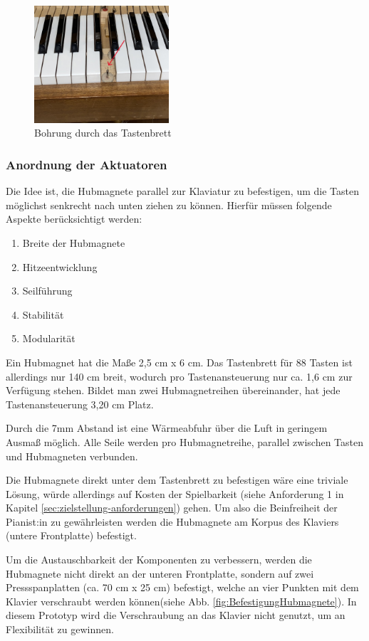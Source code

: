 \begin{figure}[htbp]
    \centering
    \includegraphics[width=5cm]{img/Klaviatur.jpg}
    \caption{Bohrung durch das Tastenbrett}
    \label{fig:klaviatur}
\end{figure}

\subsubsection{Anordnung der Aktuatoren}

Die Idee ist, die Hubmagnete parallel zur Klaviatur zu befestigen, um die Tasten möglichst senkrecht nach unten ziehen zu können.
Hierfür müssen folgende Aspekte berücksichtigt werden:

\begin{enumerate}
    \item Breite der Hubmagnete
    \item Hitzeentwicklung
    \item Seilführung
    \item Stabilität
    \item Modularität
\end{enumerate}

Ein Hubmagnet hat die Maße 2,5 cm x 6 cm.
Das Tastenbrett für 88 Tasten ist allerdings nur 140 cm breit, wodurch pro Tastenansteuerung nur ca. 1,6 cm zur Verfügung stehen.
Bildet man zwei Hubmagnetreihen übereinander, hat jede Tastenansteuerung 3,20 cm Platz.

Durch die 7mm Abstand ist eine Wärmeabfuhr über die Luft in geringem Ausmaß möglich.
Alle Seile werden pro Hubmagnetreihe, parallel zwischen Tasten und Hubmagneten verbunden.

Die Hubmagnete direkt unter dem Tastenbrett zu befestigen wäre eine triviale Lösung, würde allerdings auf Kosten der Spielbarkeit (siehe Anforderung 1 in Kapitel \ref{sec:zielstellung-anforderungen}) gehen.
Um also die Beinfreiheit der Pianist:in zu gewährleisten
werden die Hubmagnete am Korpus des Klaviers (untere Frontplatte) befestigt.

Um die Austauschbarkeit der Komponenten zu verbessern, werden die Hubmagnete nicht direkt an der unteren Frontplatte,
sondern auf zwei Pressspanplatten (ca. 70 cm x 25 cm) befestigt, welche an vier Punkten mit dem Klavier verschraubt werden können(siehe Abb. \ref{fig:BefestigungHubmagnete}).
In diesem Prototyp wird die Verschraubung an das Klavier nicht genutzt, um an Flexibilität zu gewinnen.

